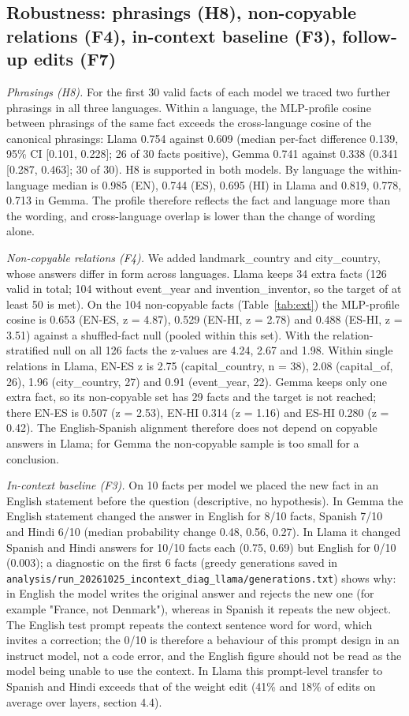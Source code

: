 \documentclass[11pt]{article}
\begin{document}
\subsection{Robustness: phrasings (H8), non-copyable relations (F4), in-context baseline (F3), follow-up edits (F7)}
\emph{Phrasings (H8).} For the first 30 valid facts of each model we traced two further phrasings in all three languages. Within a language, the MLP-profile cosine between phrasings of the same fact exceeds the cross-language cosine of the canonical phrasings: Llama 0.754 against 0.609 (median per-fact difference 0.139, 95\% CI {[}0.101, 0.228{]}; 26 of 30 facts positive), Gemma 0.741 against 0.338 (0.341 {[}0.287, 0.463{]}; 30 of 30). H8 is supported in both models. By language the within-language median is 0.985 (EN), 0.744 (ES), 0.695 (HI) in Llama and 0.819, 0.778, 0.713 in Gemma. The profile therefore reflects the fact and language more than the wording, and cross-language overlap is lower than the change of wording alone.

\emph{Non-copyable relations (F4).} We added landmark\_country and city\_country, whose answers differ in form across languages. Llama keeps 34 extra facts (126 valid in total; 104 without event\_year and invention\_inventor, so the target of at least 50 is met). On the 104 non-copyable facts (Table~\ref{tab:ext}) the MLP-profile cosine is 0.653 (EN-ES, z = 4.87), 0.529 (EN-HI, z = 2.78) and 0.488 (ES-HI, z = 3.51) against a shuffled-fact null (pooled within this set). With the relation-stratified null on all 126 facts the z-values are 4.24, 2.67 and 1.98. Within single relations in Llama, EN-ES z is 2.75 (capital\_country, n = 38), 2.08 (capital\_of, 26), 1.96 (city\_country, 27) and 0.91 (event\_year, 22). Gemma keeps only one extra fact, so its non-copyable set has 29 facts and the target is not reached; there EN-ES is 0.507 (z = 2.53), EN-HI 0.314 (z = 1.16) and ES-HI 0.280 (z = 0.42). The English-Spanish alignment therefore does not depend on copyable answers in Llama; for Gemma the non-copyable sample is too small for a conclusion.

\emph{In-context baseline (F3).} On 10 facts per model we placed the new fact in an English statement before the question (descriptive, no hypothesis). In Gemma the English statement changed the answer in English for 8/10 facts, Spanish 7/10 and Hindi 6/10 (median probability change 0.48, 0.56, 0.27). In Llama it changed Spanish and Hindi answers for 10/10 facts each (0.75, 0.69) but English for 0/10 (0.003); a diagnostic on the first 6 facts (greedy generations saved in \texttt{analysis/run\_20261025\_incontext\_diag\_llama/generations.txt}) shows why: in English the model writes the original answer and rejects the new one (for example "France, not Denmark"), whereas in Spanish it repeats the new object. The English test prompt repeats the context sentence word for word, which invites a correction; the 0/10 is therefore a behaviour of this prompt design in an instruct model, not a code error, and the English figure should not be read as the model being unable to use the context. In Llama this prompt-level transfer to Spanish and Hindi exceeds that of the weight edit (41\% and 18\% of edits on average over layers, section 4.4).
\end{document}
